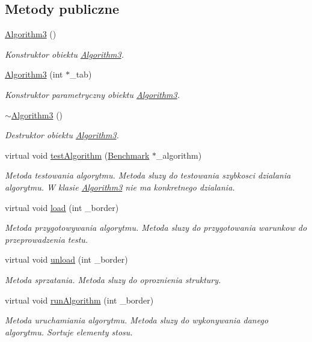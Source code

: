 \subsection*{Metody publiczne}
\begin{DoxyCompactItemize}
\item 
\hyperlink{class_algorithm3_a88d9f8567616fd898bf202602726600d}{Algorithm3} ()
\begin{DoxyCompactList}\small\item\em Konstruktor obiektu \hyperlink{class_algorithm3}{Algorithm3}. \end{DoxyCompactList}\item 
\hyperlink{class_algorithm3_a70b147e12ac584168c7b81a73daac940}{Algorithm3} (int $\ast$\-\_\-tab)
\begin{DoxyCompactList}\small\item\em Konstruktor parametryczny obiektu \hyperlink{class_algorithm3}{Algorithm3}. \end{DoxyCompactList}\item 
\hyperlink{class_algorithm3_ae9d1f5425fce3fc93d356fe8bf103e28}{$\sim$\-Algorithm3} ()
\begin{DoxyCompactList}\small\item\em Destruktor obiektu \hyperlink{class_algorithm3}{Algorithm3}. \end{DoxyCompactList}\item 
virtual void \hyperlink{class_algorithm3_a18c99d04d013ac866adc59ce8143cfe3}{test\-Algorithm} (\hyperlink{class_benchmark}{Benchmark} $\ast$\-\_\-algorithm)
\begin{DoxyCompactList}\small\item\em Metoda testowania algorytmu. Metoda sluzy do testowania szybkosci dzialania algorytmu. W klasie \hyperlink{class_algorithm3}{Algorithm3} nie ma konkretnego dzialania. \end{DoxyCompactList}\item 
virtual void \hyperlink{class_algorithm3_a92b082327e99863c82981cdaec9a45a1}{load} (int \-\_\-border)
\begin{DoxyCompactList}\small\item\em Metoda przygotowywania algorytmu. Metoda sluzy do przygotowania warunkow do przeprowadzenia testu. \end{DoxyCompactList}\item 
virtual void \hyperlink{class_algorithm3_a170d77ee28866741214e65da7efcf533}{unload} (int \-\_\-border)
\begin{DoxyCompactList}\small\item\em Metoda sprzatania. Metoda sluzy do oproznienia struktury. \end{DoxyCompactList}\item 
virtual void \hyperlink{class_algorithm3_ac5c80b248190a12fa770e0386f694570}{run\-Algorithm} (int \-\_\-border)
\begin{DoxyCompactList}\small\item\em Metoda uruchamiania algorytmu. Metoda sluzy do wykonywania danego algorytmu. Sortuje elementy stosu. \end{DoxyCompactList}\end{DoxyCompactItemize}
